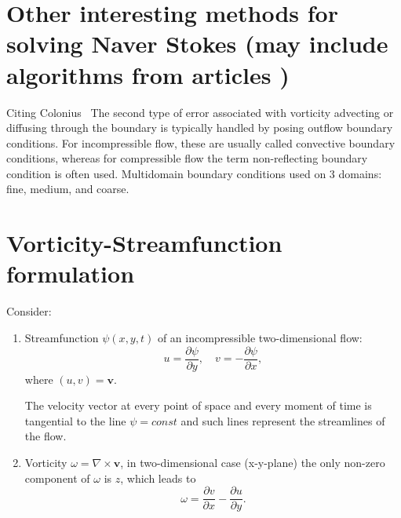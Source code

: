 \documentclass{article}
\begin{document}
\section{Other interesting methods for solving Naver Stokes (may include algorithms from articles \cite{Brown:2001, Dukowicz:1992, Kim:1985, Perot:1993})}

Citing Colonius~\cite{Colonius:2008} The second type of error associated with vorticity advecting or diffusing through the boundary is typically handled by posing outflow boundary conditions. For incompressible flow, these are usually called convective boundary conditions, whereas for compressible flow the term non-reflecting boundary condition is often used. Multidomain boundary conditions used on 3 domains: fine, medium, and coarse. 
	
	
	\section{Vorticity-Streamfunction formulation}\label{sec:vorticity-streamfunction}
	
	Consider:
	
	\begin{enumerate}
	\item	

	Streamfunction $\psi(x,y,t)$ of an incompressible two-dimensional flow:
	\begin{equation}
	\label{eqn:streamfunction}
		u = \frac{\partial \psi}{\partial y},\quad v=-\frac{\partial \psi}{\partial x},
	\end{equation}
	where $(u,v)=\boldsymbol{v}$.
	
	The velocity vector at every point of space and every moment of time is tangential to the line $\psi = const$ and such lines represent the streamlines of the flow. 
	\item
	
	Vorticity $\omega = \nabla \times \boldsymbol{v}$, in two-dimensional case (x-y-plane) the only non-zero component of $\omega$ is $z$, which leads to
	\begin{equation}
	\label{eqn:vorticity}
		\omega=\frac{\partial v}{\partial x} - \frac{\partial u}{\partial y}.
	\end{equation}
	\end{enumerate}
	
\end{document}
